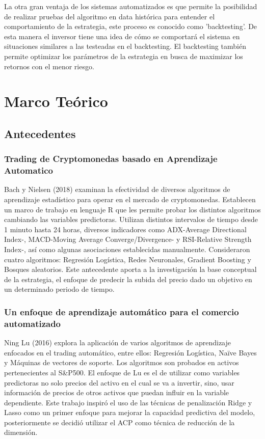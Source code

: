 \documentclass[a4paper,12pt]{Latex/Classes/PhDthesisPSnPDF}
\begin{document}
La otra gran ventaja de los sistemas automatizados es que permite la posibilidad de realizar pruebas del algoritmo en data histórica para entender el comportamiento de la estrategia, este proceso es conocido como 'backtesting'. De esta manera el inversor tiene una idea de cómo se comportará el sistema en situaciones similares a las testeadas en el backtesting. El backtesting también permite optimizar los parámetros de la estrategia en busca de maximizar los retornos con el menor riesgo. 

\chapter{Marco Teórico}

\section{Antecedentes}

\subsection{Trading de Cryptomonedas basado en Aprendizaje Automatico}

Bach y Nielsen (2018) examinan la efectividad de diversos algoritmos de aprendizaje estadístico para operar en el mercado de cryptomonedas. Establecen un marco de trabajo en lenguaje R que les permite probar los distintos algoritmos cambiando las variables predictoras. Utilizan distintos intervalos de tiempo desde 1 minuto hasta 24 horas, diversos indicadores como ADX-Average Directional Index-, MACD-Moving Average Converge/Divergence- y RSI-Relative Strength Index-, así como algunas asociaciones establecidas manualmente. Consideraron cuatro algoritmos: Regresión Logística, Redes Neuronales, Gradient Boosting y Bosques aleatorios. Este antecedente aporta a la investigación la base conceptual de la estrategia, el enfoque de predecir la subida del precio dado un objetivo en un determinado periodo de tiempo.

\subsection{Un enfoque de aprendizaje automático para el comercio automatizado}

Ning Lu (2016) explora la aplicación de varios algoritmos de aprendizaje enfocados en el trading automático, entre ellos: Regresión Logística, Naïve Bayes y Máquinas de vectores de soporte. Los algoritmos son probados en activos pertenecientes al S\&P500. El enfoque de Lu es el de utilizar como variables predictoras no solo precios del activo en el cual se va a invertir, sino, usar información de precios de otros activos que puedan influir en la variable dependiente. Este trabajo inspiró el uso de las técnicas de penalización Ridge y Lasso como un primer enfoque para mejorar la capacidad predictiva del modelo, posteriormente se decidió utilizar el ACP como técnica de reducción de la dimensión.
\end{document}
